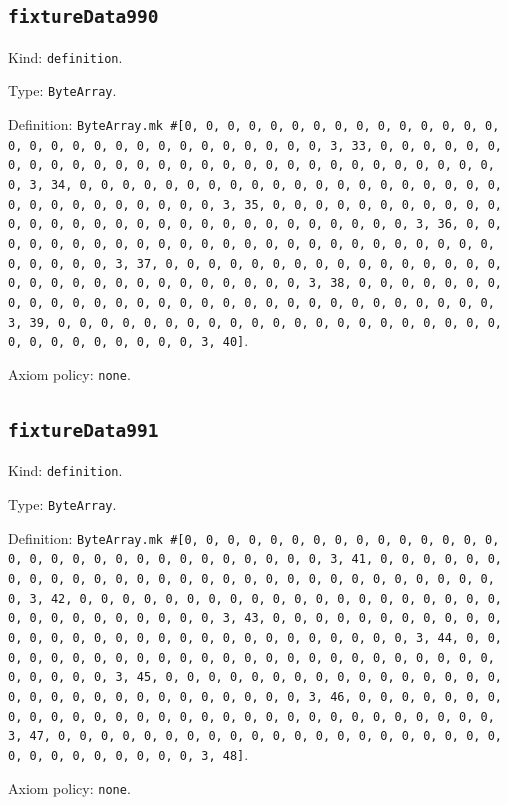 \documentclass[11pt]{article}
\begin{document}
\subsection*{\texttt{fixtureData990}}
\noindent Kind: \texttt{definition}.\par
\noindent Type: \texttt{ByteArray}.\par
\noindent Definition: \texttt{ByteArray.mk \#[0, 0, 0, 0, 0, 0, 0, 0, 0, 0, 0, 0, 0, 0, 0, 0, 0, 0, 0, 0, 0, 0, 0, 0, 0, 0, 0, 0, 0, 0, 3, 33, 0, 0, 0, 0, 0, 0, 0, 0, 0, 0, 0, 0, 0, 0, 0, 0, 0, 0, 0, 0, 0, 0, 0, 0, 0, 0, 0, 0, 0, 0, 3, 34, 0, 0, 0, 0, 0, 0, 0, 0, 0, 0, 0, 0, 0, 0, 0, 0, 0, 0, 0, 0, 0, 0, 0, 0, 0, 0, 0, 0, 0, 0, 3, 35, 0, 0, 0, 0, 0, 0, 0, 0, 0, 0, 0, 0, 0, 0, 0, 0, 0, 0, 0, 0, 0, 0, 0, 0, 0, 0, 0, 0, 0, 0, 3, 36, 0, 0, 0, 0, 0, 0, 0, 0, 0, 0, 0, 0, 0, 0, 0, 0, 0, 0, 0, 0, 0, 0, 0, 0, 0, 0, 0, 0, 0, 0, 3, 37, 0, 0, 0, 0, 0, 0, 0, 0, 0, 0, 0, 0, 0, 0, 0, 0, 0, 0, 0, 0, 0, 0, 0, 0, 0, 0, 0, 0, 0, 0, 3, 38, 0, 0, 0, 0, 0, 0, 0, 0, 0, 0, 0, 0, 0, 0, 0, 0, 0, 0, 0, 0, 0, 0, 0, 0, 0, 0, 0, 0, 0, 0, 3, 39, 0, 0, 0, 0, 0, 0, 0, 0, 0, 0, 0, 0, 0, 0, 0, 0, 0, 0, 0, 0, 0, 0, 0, 0, 0, 0, 0, 0, 0, 0, 3, 40]}.\par
\noindent Axiom policy: \texttt{none}.\par
\subsection*{\texttt{fixtureData991}}
\noindent Kind: \texttt{definition}.\par
\noindent Type: \texttt{ByteArray}.\par
\noindent Definition: \texttt{ByteArray.mk \#[0, 0, 0, 0, 0, 0, 0, 0, 0, 0, 0, 0, 0, 0, 0, 0, 0, 0, 0, 0, 0, 0, 0, 0, 0, 0, 0, 0, 0, 0, 3, 41, 0, 0, 0, 0, 0, 0, 0, 0, 0, 0, 0, 0, 0, 0, 0, 0, 0, 0, 0, 0, 0, 0, 0, 0, 0, 0, 0, 0, 0, 0, 3, 42, 0, 0, 0, 0, 0, 0, 0, 0, 0, 0, 0, 0, 0, 0, 0, 0, 0, 0, 0, 0, 0, 0, 0, 0, 0, 0, 0, 0, 0, 0, 3, 43, 0, 0, 0, 0, 0, 0, 0, 0, 0, 0, 0, 0, 0, 0, 0, 0, 0, 0, 0, 0, 0, 0, 0, 0, 0, 0, 0, 0, 0, 0, 3, 44, 0, 0, 0, 0, 0, 0, 0, 0, 0, 0, 0, 0, 0, 0, 0, 0, 0, 0, 0, 0, 0, 0, 0, 0, 0, 0, 0, 0, 0, 0, 3, 45, 0, 0, 0, 0, 0, 0, 0, 0, 0, 0, 0, 0, 0, 0, 0, 0, 0, 0, 0, 0, 0, 0, 0, 0, 0, 0, 0, 0, 0, 0, 3, 46, 0, 0, 0, 0, 0, 0, 0, 0, 0, 0, 0, 0, 0, 0, 0, 0, 0, 0, 0, 0, 0, 0, 0, 0, 0, 0, 0, 0, 0, 0, 3, 47, 0, 0, 0, 0, 0, 0, 0, 0, 0, 0, 0, 0, 0, 0, 0, 0, 0, 0, 0, 0, 0, 0, 0, 0, 0, 0, 0, 0, 0, 0, 3, 48]}.\par
\noindent Axiom policy: \texttt{none}.\par
\end{document}
